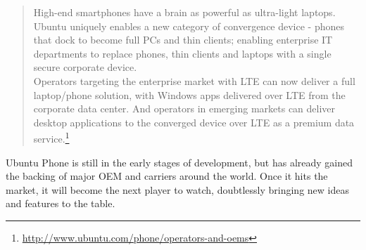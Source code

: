 \begin{quotation}
High-end smartphones have a brain as powerful as ultra-light laptops. Ubuntu uniquely enables a new category of convergence device - phones that dock to become full PCs and thin clients; enabling enterprise IT departments to replace phones, thin clients and laptops with a single secure corporate device.\\

Operators targeting the enterprise market with LTE can now deliver a full laptop/phone solution, with Windows apps delivered over LTE from the corporate data center. And operators in emerging markets can deliver desktop applications to the converged device over LTE as a premium data service.\footnote{\url{http://www.ubuntu.com/phone/operators-and-oems}}
\end{quotation}


Ubuntu Phone is still in the early stages of development, but has already gained the backing of major \ac{OEM} and carriers around the world. Once it hits the market, it will become the next player to watch, doubtlessly bringing new ideas and features to the table.
 